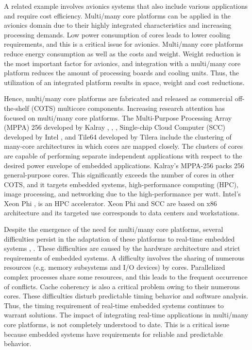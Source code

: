 \documentclass{sig-alternate-05-2015}
\begin{document}
A related example involves avionics systems that also include various applications and require cost efficiency.
Multi/many core platforms can be applied in the avionics domain due to their highly integrated characteristics and increasing processing demands.
Low power consumption of cores leads to lower cooling requirements, and this is a critical issue for avionics.
Multi/many core platforms reduce energy consumption as well as the costs and weight.
Weight reduction is the most important factor for avionics, and integration with a multi/many core platform reduces the amount of processing boards and cooling units.
Thus, the utilization of an integrated platform results in space, weight and cost reductions.

Hence, multi/many core platforms are fabricated and released as commercial off-the-shelf (COTS) multicore components.
Increasing research attention has focused on multi/many core platforms.
The Multi-Purpose Processing Array (MPPA) 256 developed by Kalray \cite{de2013distributed}, \cite{de2013clustered}, \cite{de2014time}, Single-chip Cloud Computer (SCC) developed by Intel \cite{baron2010single}, and Tile64 developed by Tilera \cite{bell2008tile64} include the clustering of many-core architectures in which cores are mapped closely.
The clusters of cores are capable of performing separate independent applications with respect to the desired power envelope of embedded applications.
Kalray's MPPA-256 packs 256 general-purpose cores.
This significantly exceeds the number of cores in other COTS, and it targets embedded systems, high-performance computing (HPC), image processing, and networking due to the high-performance per watt.
Intel's Xeon Phi \cite{chrysos2014intel}, \cite{chrysos2012intel} is an HPC accelerator.
Xeon Phi and SCC are based on x86 architecture and its targeted use corresponds to data centers and workstations.

Despite the emergence of the need for multi/many core platforms, several difficulties persist in the adaptation of these platforms to real-time embedded systems \cite{becker2016contention}, \cite{saidi2015shift}.
These difficulties are caused by the hardware architecture and strict requirements of embedded systems.
A difficulty involves the sharing of numerous resources (e.g. memory subsystems and I/O devices) by cores. Parallelized complex processes share some resources, and this leads to the frequent occurrence of conflicts.
Cache coherency is also a critical problem owing to their numerous cores.
These difficulties disturb predictable timing behavior and software analysis.
Thus, the timing requirement of real-time embedded systems continues to warrant solutions.
The impact of integrating real-time applications in multi/many core platforms, is not completely understood to date.
This is a critical issue because embedded systems have requirements for reliable and predictable behavior.
\end{document}

